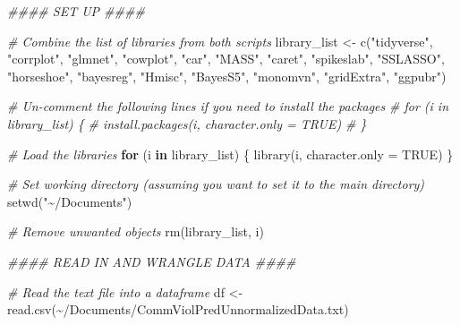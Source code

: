 \documentclass[
  11pt,
]{article}
\newenvironment{Shaded}{}{}
\newcommand{\AttributeTok}[1]{\textcolor[rgb]{0.49,0.56,0.16}{#1}}
\newcommand{\CommentTok}[1]{\textcolor[rgb]{0.38,0.63,0.69}{\textit{#1}}}
\newcommand{\ConstantTok}[1]{\textcolor[rgb]{0.53,0.00,0.00}{#1}}
\newcommand{\ControlFlowTok}[1]{\textcolor[rgb]{0.00,0.44,0.13}{\textbf{#1}}}
\newcommand{\DocumentationTok}[1]{\textcolor[rgb]{0.73,0.13,0.13}{\textit{#1}}}
\newcommand{\FunctionTok}[1]{\textcolor[rgb]{0.02,0.16,0.49}{#1}}
\newcommand{\NormalTok}[1]{#1}
\newcommand{\OtherTok}[1]{\textcolor[rgb]{0.00,0.44,0.13}{#1}}
\newcommand{\StringTok}[1]{\textcolor[rgb]{0.25,0.44,0.63}{#1}}
\begin{document}
\begin{Shaded}
\begin{Highlighting}[]
\DocumentationTok{\#\#\#\# SET UP \#\#\#\#}

\CommentTok{\# Combine the list of libraries from both scripts}
\NormalTok{library\_list }\OtherTok{\textless{}{-}} \FunctionTok{c}\NormalTok{(}\StringTok{"tidyverse"}\NormalTok{, }\StringTok{"corrplot"}\NormalTok{, }\StringTok{"glmnet"}\NormalTok{, }\StringTok{"cowplot"}\NormalTok{, }\StringTok{"car"}\NormalTok{, }\StringTok{"MASS"}\NormalTok{, }
                  \StringTok{"caret"}\NormalTok{, }\StringTok{"spikeslab"}\NormalTok{, }\StringTok{"SSLASSO"}\NormalTok{, }\StringTok{"horseshoe"}\NormalTok{, }\StringTok{"bayesreg"}\NormalTok{, }
                  \StringTok{"Hmisc"}\NormalTok{, }\StringTok{"BayesS5"}\NormalTok{, }\StringTok{"monomvn"}\NormalTok{, }\StringTok{"gridExtra"}\NormalTok{, }\StringTok{"ggpubr"}\NormalTok{)}

\CommentTok{\# Un{-}comment the following lines if you need to install the packages}
\CommentTok{\# for (i in library\_list) \{}
\CommentTok{\#   install.packages(i, character.only = TRUE)}
\CommentTok{\# \}}

\CommentTok{\# Load the libraries}
\ControlFlowTok{for}\NormalTok{ (i }\ControlFlowTok{in}\NormalTok{ library\_list) \{}
  \FunctionTok{library}\NormalTok{(i, }\AttributeTok{character.only =} \ConstantTok{TRUE}\NormalTok{)}
\NormalTok{\}}

\CommentTok{\# Set working directory (assuming you want to set it to the \textquotesingle{}main\textquotesingle{} directory)}
\FunctionTok{setwd}\NormalTok{(}\StringTok{"\textasciitilde{}/Documents"}\NormalTok{)}

\CommentTok{\# Remove unwanted objects}
\FunctionTok{rm}\NormalTok{(library\_list, i)}

\DocumentationTok{\#\#\#\# READ IN AND WRANGLE DATA \#\#\#\#}

\CommentTok{\# Read the text file into a dataframe}
\NormalTok{df }\OtherTok{\textless{}{-}} \FunctionTok{read.csv}\NormalTok{(}\StringTok{\textquotesingle{}\textasciitilde{}/Documents/CommViolPredUnnormalizedData.txt\textquotesingle{}}\NormalTok{)}


\end{Highlighting}
\end{Shaded}
\end{document}
